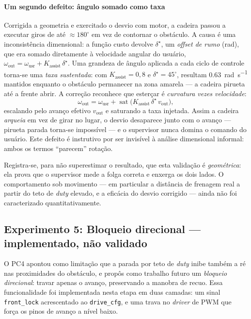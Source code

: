 \documentclass[conference]{IEEEtran}
\begin{document}
\paragraph{Um segundo defeito: ângulo somado como taxa} Corrigida a geometria e
exercitado o desvio com motor, a cadeira passou a executar giros de até
$\approx 180^\circ$ em vez de contornar o obstáculo. A causa é uma inconsistência
dimensional: a função custo devolve $\delta^\star$, um \emph{offset de rumo}
(rad), que era somado diretamente à velocidade angular do usuário,
$\omega_{\text{out}} = \omega_{\text{usr}} + K_{\text{assist}}\,\delta^\star$.
Uma grandeza de ângulo aplicada a cada ciclo de controle torna-se uma
\emph{taxa sustentada}: com $K_{\text{assist}}=0{,}8$ e
$\delta^\star=45^\circ$, resultam \SI{0.63}{\radian\per\second} mantidos enquanto
o obstáculo permanecer na zona amarela --- a cadeira pirueta até a frente abrir.
A correção reconhece que esterçar é \emph{curvatura vezes velocidade}:
\begin{equation}
\omega_{\text{out}} = \omega_{\text{usr}} +
\operatorname{sat}\!\big(K_{\text{assist}}\,\delta^\star\, v_{\text{out}}\big),
\end{equation}
\noindent escalando pelo avanço efetivo $v_{\text{out}}$ e saturando a taxa
injetada. Assim a cadeira \emph{arqueia} em vez de girar no lugar, o desvio
desaparece junto com o avanço --- pirueta parada torna-se impossível --- e o
supervisor nunca domina o comando do usuário. Este defeito é instrutivo por ser
invisível à análise dimensional informal: ambos os termos ``parecem'' rotação.

Registra-se, para não superestimar o resultado, que esta validação é
\emph{geométrica}: ela prova que o supervisor mede a folga correta e enxerga os
dois lados. O comportamento sob movimento --- em particular a distância de
frenagem real a partir do teto de \emph{duty} elevado, e a eficácia do desvio
corrigido --- ainda não foi caracterizado quantitativamente.

\subsection{Experimento 5: Bloqueio direcional --- implementado, não validado}
\label{sec:frontlock}

O PC4 apontou como limitação que a parada por teto de \emph{duty} inibe também a
ré nas proximidades do obstáculo, e propôs como trabalho futuro um
\emph{bloqueio direcional}: travar apenas o avanço, preservando a manobra de
recuo. Essa funcionalidade foi implementada nesta etapa em duas camadas: um sinal
\texttt{front\_lock} acrescentado ao \texttt{drive\_cfg}, e uma trava no
\emph{driver} de PWM que força os pinos de avanço a nível baixo.
\end{document}
